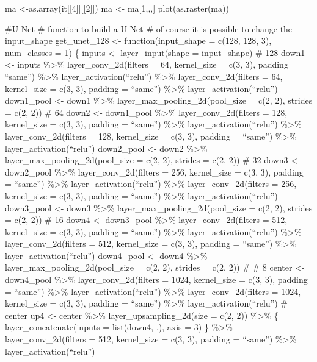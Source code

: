 \documentclass[
]{article}
\begin{document}
{{{{ma \textless-as.array(it{[}{[}4{]}{]}{[}{[}2{]}{]}) ma \textless-
ma{[}1,,,{]} plot(as.raster(ma))

\#U-Net \# function to build a U-Net \# of course it is possible to
change the input\_shape get\_unet\_128 \textless- function(input\_shape
= c(128, 128, 3), num\_classes = 1) \{ inputs \textless-
layer\_input(shape = input\_shape) \# 128 down1 \textless- inputs
\%\textgreater\% layer\_conv\_2d(filters = 64, kernel\_size = c(3, 3),
padding = ``same'') \%\textgreater\% layer\_activation(``relu'')
\%\textgreater\% layer\_conv\_2d(filters = 64, kernel\_size = c(3, 3),
padding = ``same'') \%\textgreater\% layer\_activation(``relu'')
down1\_pool \textless- down1 \%\textgreater\%
layer\_max\_pooling\_2d(pool\_size = c(2, 2), strides = c(2, 2)) \# 64
down2 \textless- down1\_pool \%\textgreater\% layer\_conv\_2d(filters =
128, kernel\_size = c(3, 3), padding = ``same'') \%\textgreater\%
layer\_activation(``relu'') \%\textgreater\% layer\_conv\_2d(filters =
128, kernel\_size = c(3, 3), padding = ``same'') \%\textgreater\%
layer\_activation(``relu'') down2\_pool \textless- down2
\%\textgreater\% layer\_max\_pooling\_2d(pool\_size = c(2, 2), strides =
c(2, 2)) \# 32 down3 \textless- down2\_pool \%\textgreater\%
layer\_conv\_2d(filters = 256, kernel\_size = c(3, 3), padding =
``same'') \%\textgreater\% layer\_activation(``relu'') \%\textgreater\%
layer\_conv\_2d(filters = 256, kernel\_size = c(3, 3), padding =
``same'') \%\textgreater\% layer\_activation(``relu'') down3\_pool
\textless- down3 \%\textgreater\% layer\_max\_pooling\_2d(pool\_size =
c(2, 2), strides = c(2, 2)) \# 16 down4 \textless- down3\_pool
\%\textgreater\% layer\_conv\_2d(filters = 512, kernel\_size = c(3, 3),
padding = ``same'') \%\textgreater\% layer\_activation(``relu'')
\%\textgreater\% layer\_conv\_2d(filters = 512, kernel\_size = c(3, 3),
padding = ``same'') \%\textgreater\% layer\_activation(``relu'')
down4\_pool \textless- down4 \%\textgreater\%
layer\_max\_pooling\_2d(pool\_size = c(2, 2), strides = c(2, 2)) \# \# 8
center \textless- down4\_pool \%\textgreater\% layer\_conv\_2d(filters =
1024, kernel\_size = c(3, 3), padding = ``same'') \%\textgreater\%
layer\_activation(``relu'') \%\textgreater\% layer\_conv\_2d(filters =
1024, kernel\_size = c(3, 3), padding = ``same'') \%\textgreater\%
layer\_activation(``relu'') \# center up4 \textless- center
\%\textgreater\% layer\_upsampling\_2d(size = c(2, 2)) \%\textgreater\%
\{ layer\_concatenate(inputs = list(down4, .), axis = 3) \}
\%\textgreater\% layer\_conv\_2d(filters = 512, kernel\_size = c(3, 3),
padding = ``same'') \%\textgreater\% layer\_activation(``relu'')
}}}}
\end{document}
